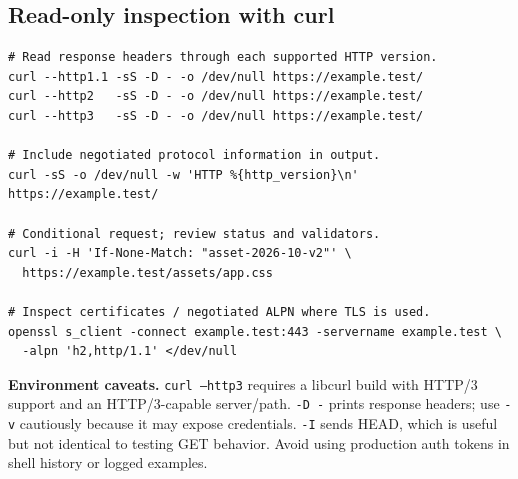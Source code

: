 \documentclass[10pt,letterpaper,oneside]{article}
\begin{document}
\subsection{Read-only inspection with curl}
\begin{lstlisting}
# Read response headers through each supported HTTP version.
curl --http1.1 -sS -D - -o /dev/null https://example.test/
curl --http2   -sS -D - -o /dev/null https://example.test/
curl --http3   -sS -D - -o /dev/null https://example.test/

# Include negotiated protocol information in output.
curl -sS -o /dev/null -w 'HTTP %{http_version}\n' https://example.test/

# Conditional request; review status and validators.
curl -i -H 'If-None-Match: "asset-2026-10-v2"' \
  https://example.test/assets/app.css

# Inspect certificates / negotiated ALPN where TLS is used.
openssl s_client -connect example.test:443 -servername example.test \
  -alpn 'h2,http/1.1' </dev/null
\end{lstlisting}
\textbf{Environment caveats.} \texttt{curl --http3} requires a libcurl build with HTTP/3 support and an HTTP/3-capable server/path. \texttt{-D -} prints response headers; use \texttt{-v} cautiously because it may expose credentials. \texttt{-I} sends HEAD, which is useful but not identical to testing GET behavior. Avoid using production auth tokens in shell history or logged examples.
\end{document}
